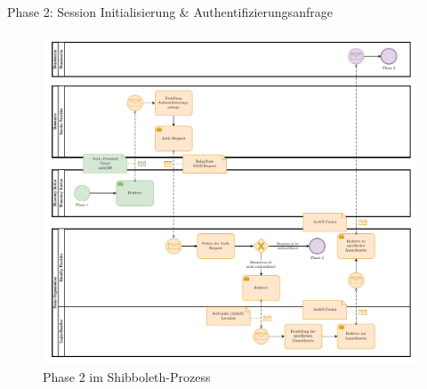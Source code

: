 \begin{frame}{Phase 2: Session Initialisierung \& Authentifizierungsanfrage}

    \begin{figure}
        \includegraphics[height=0.7\paperheight]{../assets/bis_bpmn_phase_2.drawio.pdf}
        \caption{Phase 2 im Shibboleth-Prozess~\cite[vgl.][]{switchExpertDemoSWITCHaai2024a}}
    \end{figure}
\end{frame}



